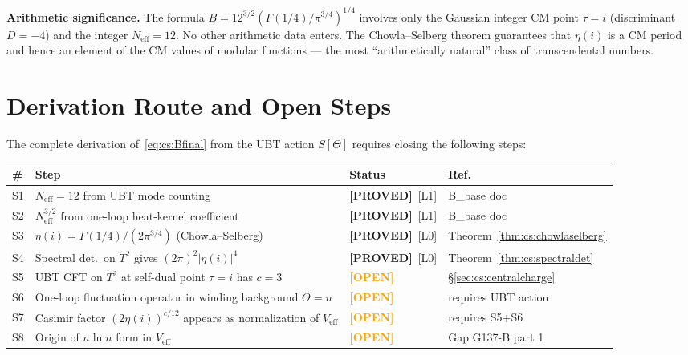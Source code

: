 \documentclass[12pt,a4paper]{article}
\theoremstyle{definition}
\theoremstyle{remark}
\newcommand{\OPEN}{\textcolor{orange}{\textbf{[OPEN]}}}
\newcommand{\PROVED}{\textcolor{green!60!black}{\textbf{[PROVED]}}}
\newcommand{\Lzero}{[L0]}
\newcommand{\Lone}{[L1]}
\begin{document}
\begin{insightbox}
\textbf{Arithmetic significance.}
The formula $B = 12^{3/2}(\Gamma(1/4)/\pi^{3/4})^{1/4}$ involves only
the Gaussian integer CM point $\tau = i$ (discriminant $D = -4$) and the
integer $N_{\mathrm{eff}} = 12$.  No other arithmetic data enters.  The
Chowla--Selberg theorem guarantees that $\eta(i)$ is a CM period and hence
an element of the CM values of modular functions — the most
``arithmetically natural'' class of transcendental numbers.
\end{insightbox}

\section{Derivation Route and Open Steps}
\label{sec:cs:gaps}

The complete derivation of~\eqref{eq:cs:Bfinal} from the UBT action
$S[\Theta]$ requires closing the following steps:

\begin{center}
\renewcommand{\arraystretch}{1.5}
\begin{tabular}{p{0.5cm} p{8.5cm} p{2.5cm} p{2cm}}
\toprule
\# & Step & Status & Ref. \\
\midrule
S1 & $N_{\mathrm{eff}} = 12$ from UBT mode counting &
     \PROVED\ \Lone & B\_base doc \\
S2 & $N_{\mathrm{eff}}^{3/2}$ from one-loop heat-kernel coefficient &
     \PROVED\ \Lone & B\_base doc \\
S3 & $\eta(i) = \Gamma(1/4)/(2\pi^{3/4})$ (Chowla--Selberg) &
     \PROVED\ \Lzero & Theorem~\ref{thm:cs:chowlaselberg} \\
S4 & Spectral det.\ on $T^2$ gives $(2\pi)^2|\eta(i)|^4$ &
     \PROVED\ \Lzero & Theorem~\ref{thm:cs:spectraldet} \\
S5 & UBT CFT on $T^2$ at self-dual point $\tau=i$ has $c=3$ &
     \OPEN & §\ref{sec:cs:centralcharge} \\
S6 & One-loop fluctuation operator in winding background $\bar\Theta=n$ &
     \OPEN & requires UBT action \\
S7 & Casimir factor $(2\eta(i))^{c/12}$ appears as normalization of $V_{\mathrm{eff}}$ &
     \OPEN & requires S5+S6 \\
S8 & Origin of $n\ln n$ form in $V_{\mathrm{eff}}$ &
     \OPEN & Gap G137-B part 1 \\
\bottomrule
\end{tabular}
\end{center}
\end{document}
